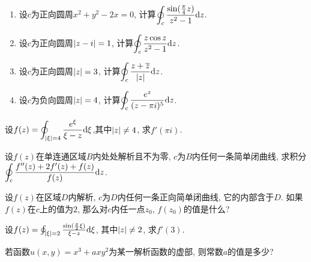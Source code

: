 \begin{yyEx}
\begin{enumerate}
		\item 设$c$为正向圆周$x^2+y^2-2x = 0$, 计算$\begin{lgathered}\oint_c\frac{\sin(\frac{\pi}{4}z)}{z^2-1}\mathrm{d}z\end{lgathered}$.
		\item 设$c$为正向圆周$\lvert z-i\rvert = 1$, 计算$\begin{lgathered}\oint_c\frac{z\cos z}{z^2-1}\mathrm{d}z\end{lgathered}$.
		\item 设$c$为正向圆周$\lvert z\rvert = 3$, 计算$\begin{lgathered}\oint_c\frac{z+\overline{z}}{\abs{z}}\mathrm{d}z\end{lgathered}$.
		\item 设$c$为负向圆周$\lvert z\rvert = 4$, 计算$\begin{lgathered}\oint_c\frac{e^z}{(z-\pi i)^5}\mathrm{d}z\end{lgathered}$.
	\end{enumerate}
\end{yyEx}

\begin{yyEx}
	设$\begin{lgathered}f(z) = \oint_{\abs{\xi} = 4}\frac{e^\xi}{\xi - z}\mathrm{d}\xi\end{lgathered}$,其中$\lvert z\rvert\neq 4$, 求$f'(\pi i)$.
\end{yyEx}

\begin{yyEx}
	设$f(z)$在单连通区域$B$内处处解析且不为零, $c$为$B$内任何一条简单闭曲线, 求积分$\begin{lgathered}\oint_c\frac{f''(z)+2f'(z)+f(z)}{f(z)}\mathrm{d}z\end{lgathered}$.
\end{yyEx}

\begin{yyEx}
	设$f(z)$在区域$D$内解析, $c$为$D$内任何一条正向简单闭曲线, 它的内部含于$D$. 如果$f(z)$在$c$上的值为$2$, 那么对$c$内任一点$z_0$, $f(z_0)$的值是什么?
\end{yyEx}

\begin{yyEx}
	设$f(z) = \oint_{\lvert\xi\rvert = 2}\frac{\sin(\frac{\pi}{2}\xi)}{\xi-z}\mathrm{d}\xi$, 其中$\lvert z\rvert \neq 2$, 求$f'(3)$.
\end{yyEx}

\begin{yyEx}
	若函数$u(x,y) = x^3+axy^2$为某一解析函数的虚部, 则常数$a$的值是多少?
\end{yyEx}

